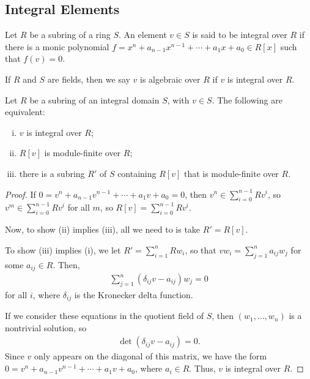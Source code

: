 \documentclass[10pt]{mypackage}
\begin{document}
\subsection{Integral Elements}%
\begin{definition}
  Let $R$ be a subring of a ring $S$. An element $v\in S$ is said to be integral over $R$ if there is a monic polynomial $f = x^n + a_{n-1}x^{n-1} + \cdots + a_{1}x + a_0\in R\left[ x \right]$ such that $f(v) = 0$.\newline

  If $R$ and $S$ are fields, then we say $v$ is algebraic over $R$ if $v$ is integral over $R$.
\end{definition}
\begin{proposition}
  Let $R$ be a subring of an integral domain $S$, with $v\in S$. The following are equivalent:
  \begin{enumerate}[(i)]
    \item $v$ is integral over $R$;
    \item $R\left[ v \right]$ is module-finite over $R$;
    \item there is a subring $R'$ of $S$ containing $R\left[ v \right]$ that is module-finite over $R$.
  \end{enumerate}
\end{proposition}
\begin{proof}\hfill
  If $0 = v^n + a_{n-1}v^{n-1} + \cdots + a_{1}v + a_0 = 0$, then $v^n\in \sum_{i=0}^{n-1}Rv^i$, so $v^{m}\in \sum_{i=0}^{n-1}Rv^i$ for all $m$, so $R\left[ v \right] = \sum_{i=0}^{n-1}Rv^i$.\newline

  Now, to show (ii) implies (iii), all we need to is take $R' = R\left[ v \right]$.\newline

  To show (iii) implies (i), we let $R' = \sum_{i=1}^{n}Rw_i$, so that $vw_i = \sum_{j=1}^{n}a_{ij}w_j$ for some $a_{ij}\in R$. Then,
  \begin{align*}
    \sum_{j=1}^{n} \left( \delta_{ij}v - a_{ij} \right)w_j = 0
  \end{align*}
  for all $i$, where $\delta_{ij}$ is the Kronecker delta function.\newline

  If we consider these equations in the quotient field of $S$, then $\left( w_1,\dots,w_n \right)$ is a nontrivial solution, so
  \begin{align*}
    \det\left( \delta_{ij}v - a_{ij} \right) = 0.
  \end{align*}
   Since $v$ only appears on the diagonal of this matrix, we have the form $0 = v^n + a_{n-1}v^{n-1} + \cdots + a_{1}v + a_0$, where $a_i\in R$. Thus, $v$ is integral over $R$.
\end{proof}
\end{document}
